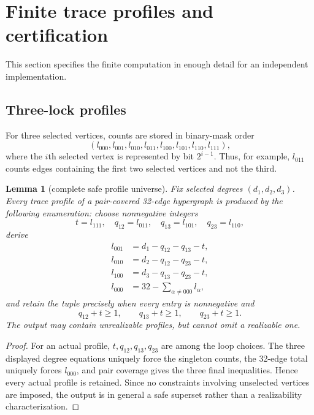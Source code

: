 \documentclass[11pt]{article}
\newtheorem{lemma}[theorem]{Lemma}
\theoremstyle{remark}
\begin{document}
\section{Finite trace profiles and certification}\label{sec:profiles}

This section specifies the finite computation in enough detail for an
independent implementation.

\subsection{Three-lock profiles}

For three selected vertices, counts are stored in binary-mask order
\begin{equation}\label{eq:mask-order}
(l_{000},l_{001},l_{010},l_{011},l_{100},l_{101},l_{110},l_{111}),
\end{equation}
where the $i$th selected vertex is represented by bit $2^{i-1}$.  Thus, for
example, $l_{011}$ counts edges containing the first two selected vertices
and not the third.

\begin{lemma}[complete safe profile universe]\label{lem:profiles}
Fix selected degrees $(d_1,d_2,d_3)$.  Every trace profile of a
pair-covered 32-edge hypergraph is produced by the following enumeration:
choose nonnegative integers
\[
t=l_{111},\quad q_{12}=l_{011},\quad
q_{13}=l_{101},\quad q_{23}=l_{110},
\]
derive
\begin{align*}
l_{001}&=d_1-q_{12}-q_{13}-t,\\
l_{010}&=d_2-q_{12}-q_{23}-t,\\
l_{100}&=d_3-q_{13}-q_{23}-t,\\
l_{000}&=32-\sum_{\alpha\ne000}l_\alpha,
\end{align*}
and retain the tuple precisely when every entry is nonnegative and
\[
q_{12}+t\ge1,\qquad q_{13}+t\ge1,
\qquad q_{23}+t\ge1.
\]
The output may contain unrealizable profiles, but cannot omit a realizable
one.
\end{lemma}

\begin{proof}
For an actual profile, $t,q_{12},q_{13},q_{23}$ are among the loop choices.
The three displayed degree equations uniquely force the singleton counts,
the 32-edge total uniquely forces $l_{000}$, and pair coverage gives the
three final inequalities.  Hence every actual profile is retained.  Since
no constraints involving unselected vertices are imposed, the output is in
general a safe superset rather than a realizability characterization.
\end{proof}
\end{document}
